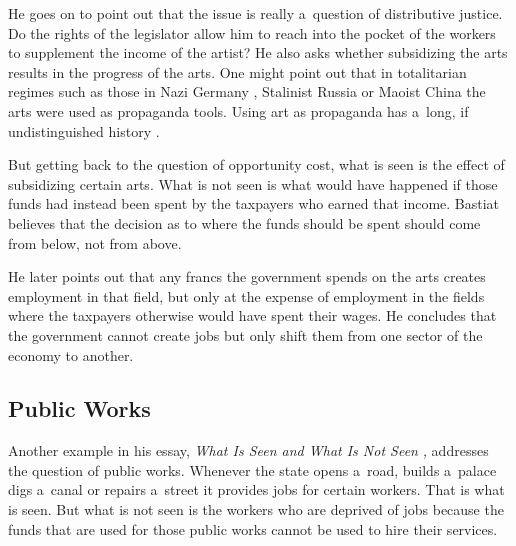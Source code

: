 He goes on to point out that the issue is really a~question of distributive justice. Do the rights of the legislator allow him to reach into the pocket of the workers to supplement the income of the artist? He also asks whether subsidizing the arts results in the progress of the arts. One might point out that in totalitarian regimes such as those in Nazi Germany 
\parencite[][]{furstenau_how_2020}, %
 Stalinist Russia 
\parencite[][]{beale_history_2019} %
 or Maoist China 
\parencite[][]{burgess_art_2018} %
 the arts were used as propaganda tools. Using art as propaganda has a~long, if undistinguished history 
\parencites[][]{}[][]{weissman_how_2023}.%




But getting back to the question of opportunity cost, what is seen is the effect of subsidizing certain arts. What is not seen is what would have happened if those funds had instead been spent by the taxpayers who earned that income. Bastiat believes that the decision as to where the funds should be spent should come from below, not from above.



He later points out that any francs the government spends on the arts creates employment in that field, but only at the expense of employment in the fields where the taxpayers otherwise would have spent their wages. He concludes that the government cannot create jobs but only shift them from one sector of the economy to another.



\subsection{Public Works}



Another example in his essay, \textit{What Is Seen and What Is Not Seen} 
\parencite[][]{bastiat_selected_1964}%
\textit{,} addresses the question of public works. Whenever the state opens a~road, builds a~palace digs a~canal or repairs a~street it provides jobs for certain workers. That is what is seen. But what is not seen is the workers who are deprived of jobs because the funds that are used for those public works cannot be used to hire their services.



